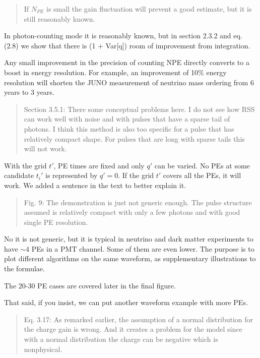 \documentclass[12pt]{article}
\begin{document}
\begin{quote}
If $N_{PE}$ is small the gain fluctuation will prevent a good estimate, but it is still reasonably known.
\end{quote}

In photon-counting mode it is reasonably known, but in section 2.3.2 and eq. (2.8) we show that there is (1 + Var[q]) room of improvement from integration.

Any small improvement in the precision of counting NPE directly converts to a boost in energy resolution. For example, an improvement of 10\% energy resolution will shorten the JUNO measurement of neutrino mass ordering from 6 years to 3 years.

\begin{quote}
Section 3.5.1: There some conceptual problems here. I do not see how RSS can work well with noise and with pulses that have a sparse tail of photons. I think this method is also too specific for a pulse that has relatively compact shape. For pulses that are long with sparse tails this will not work.
\end{quote}

With the grid $t'$, PE times are fixed and only $q'$ can be varied.  No PEs at some candidate $t_i'$ is represented by $q'=0$.  If the grid $t'$ covers all the PEs, it will work.  We added a sentence in the text to better explain it.

\begin{quote}
Fig. 9: The demonstration is just not generic enough. The pulse structure assumed is relatively compact with only a few photons and with good single PE resolution.
\end{quote}

No it is not generic, but it is typical in neutrino and dark matter experiments to have $\sim 4$ PEs in a PMT channel.  Some of them are even lower. The purpose is to plot different algorithms on the same waveform, as supplementary illustrations to the formulae.

The 20-30 PE cases are covered later in the final figure.

That said, if you insist, we can put another waveform example with more PEs.

\begin{quote}
Eq. 3.17: As remarked earlier, the assumption of a normal distribution for the charge gain is wrong. And it creates a problem for the model since with a normal distribution the charge can be negative which is nonphysical.
\end{quote}
\end{document}
